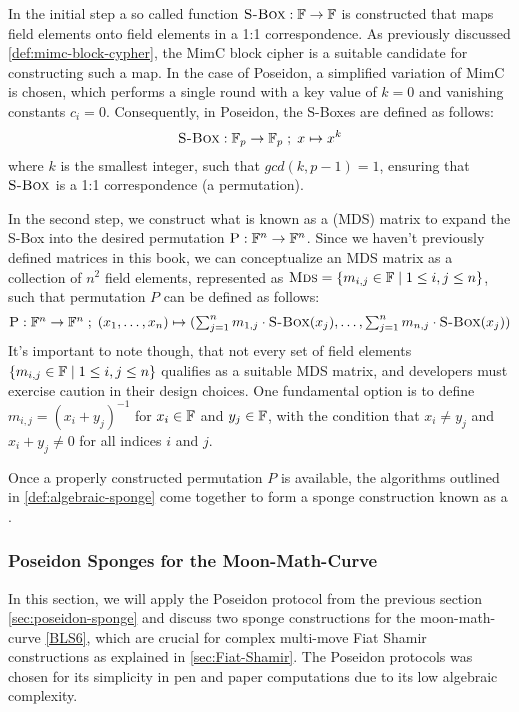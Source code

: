 In the initial step a so called  function $\textsc{S-Box}:\mathbb{F} \to \mathbb{F}$ is constructed that maps field elements onto field elements in a 1:1 correspondence. As previously discussed \ref{def:mimc-block-cypher}, the MimC block cipher is a suitable candidate for constructing such a map. In the case of Poseidon, a simplified variation of MimC is chosen, which performs a single round with a key value of $k=0$ and vanishing constants $c_i=0$. Consequently, in Poseidon, the S-Boxes are defined as follows:
\begin{equation}
\textsc{S-Box}: \mathbb{F}_p \to \mathbb{F}_p\;;\; x \mapsto x^k
\end{equation}
where $k$ is the smallest integer, such that $gcd(k,p-1)=1$, ensuring that $\textsc{S-Box}$ is a 1:1 correspondence (a permutation). 

In the second step, we construct what is known as a  (MDS) matrix to expand the S-Box into the desired permutation $\textsc{P}:\mathbb{F}^n \to \mathbb{F}^n$. Since we haven't previously defined matrices in this book, we can conceptualize an MDS matrix as a collection of $n^2$ field elements, represented as $\textsc{Mds} = \{m_{i,j}\in \mathbb{F} \; | \; 1 \leq i, j \leq n\}$, such that permutation $P$ can be defined as follows:
\begin{equation}
\textstyle\textsc{P}:\mathbb{F}^n \to \mathbb{F}^n\;;\; (x_1,\ldots,x_n) \mapsto
(\sum_{j=1}^n m_{1,j}\cdot\textsc{S-Box}(x_j),\ldots, \sum_{j=1}^n m_{n,j}\cdot\textsc{S-Box}(x_j))
\end{equation}
It's important to note though, that not every set of field elements $\{m_{i,j}\in \mathbb{F} \; | \; 1 \leq i, j \leq n\}$ qualifies as a suitable MDS matrix, and developers must exercise caution in their design choices. One fundamental option is to define $m_{i,j}=(x_i+y_j)^{-1}$ for $x_i\in \mathbb{F}$ and $y_j\in \mathbb{F}$, with the condition that $x_i \neq y_j$ and $x_i + y_j \neq 0$ for all indices $i$ and $j$.

Once a properly constructed permutation $P$ is available, the algorithms outlined in \ref{def:algebraic-sponge} come together to form a sponge construction known as a .
\subsubsection{Poseidon Sponges for the Moon-Math-Curve}
In this section, we will apply the Poseidon protocol from the previous section \ref{sec:poseidon-sponge} and discuss two sponge constructions for the moon-math-curve \ref{BLS6}, which are crucial for complex multi-move Fiat Shamir constructions as explained in \ref{sec:Fiat-Shamir}. The Poseidon protocols was  chosen for its simplicity in pen and paper computations due to its low algebraic complexity.


